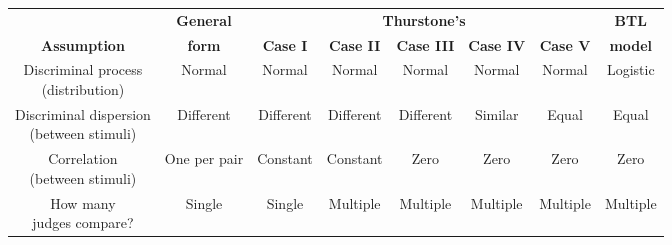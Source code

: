 \documentclass[border=3mm, varwidth=500mm]{standalone}
\begin{document}
\centering
\begin{table}[h!]
    \begin{center}
    \begin{tabular}{cccccccc}
        & \textbf{General} & \multicolumn{5}{c}{ \textbf{Thurstone's} } & \textbf{BTL} \\
        \cline{3-7}
        \textbf{Assumption} & \textbf{form} & \textbf{Case I} & \textbf{Case II} & \textbf{Case III} & \textbf{Case IV} & \textbf{Case V} & \textbf{model} \\
        \hline
        
        \rowcolor{gray.95} \Centerstack{ Discriminal process \\ (distribution) } & Normal & Normal & Normal & Normal & Normal & Normal & Logistic \\
        
        \Centerstack{ Discriminal dispersion \\ (between stimuli) } & Different & Different & Different & Different & Similar & Equal & Equal \\

        \rowcolor{gray.95} \Centerstack{ Correlation \\ (between stimuli) } & One per pair & Constant & Constant & Zero & Zero & Zero & Zero \\

        \Centerstack{ How many \\ judges compare? } & Single & Single & Multiple & Multiple & Multiple & Multiple & Multiple \\

         
    \end{tabular}
    \end{center}
\end{table}
\end{document}
